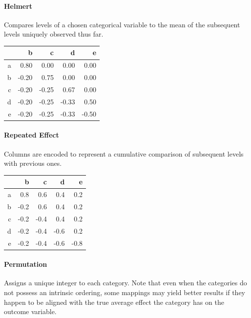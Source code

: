 \documentclass{article}
\theoremstyle{plain}
\theoremstyle{definition}
\theoremstyle{remark}
\begin{document}
\paragraph{Helmert} Compares levels of a chosen categorical variable to the mean of the subsequent levels uniquely observed thus far.

\begin{table}[H]
	\centering
	\begin{tabular}{rrrrr}
		\hline
		& b & c & d & e \\
		\hline
		a & 0.80 & 0.00 & 0.00 & 0.00 \\
		b & -0.20 & 0.75 & 0.00 & 0.00 \\
		c & -0.20 & -0.25 & 0.67 & 0.00 \\
		d & -0.20 & -0.25 & -0.33 & 0.50 \\
		e & -0.20 & -0.25 & -0.33 & -0.50 \\
		\hline
	\end{tabular}
\end{table}


\paragraph{Repeated Effect} Columns are encoded to represent a cumulative comparison of subsequent levels with previous ones.

\begin{table}[H]
	\centering
	\begin{tabular}{rrrrr}
		\hline
		& b & c & d & e \\
		\hline
		a & 0.8 & 0.6 & 0.4 & 0.2\\
		b & -0.2 & 0.6 & 0.4&  0.2\\
		c & -0.2& -0.4 & 0.4 & 0.2\\
		d & -0.2 &-0.4& -0.6&  0.2\\
		e & -0.2& -0.4& -0.6 &-0.8\\
		\hline
	\end{tabular}
\end{table}

\paragraph{Permutation} Assigns a unique integer to each category. Note that even when the categories do not possess an intrinsic ordering, some mappings may yield better results if they happen to be aligned with the true average effect the category has on the outcome variable.
\end{document}

